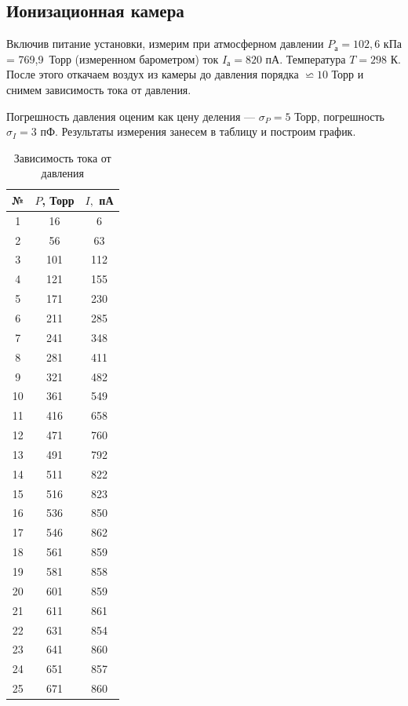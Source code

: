 \documentclass[12pt]{kiarticle}
\begin{document}
		\subsection{Ионизационная камера}
		
		Включив питание установки, измерим при атмосферном давлении $ P_а = 102,6 $ кПа = 769,9~Торр (измеренном барометром) ток $ I_а = 820 $ пА. Температура $ T = 298 $ К. После этого откачаем воздух из камеры до давления порядка $ \backsimeq 10 $ Торр и снимем зависимость тока от давления.
		
		Погрешность давления оценим как цену деления --- $ \sigma_P = 5 $ Торр, погрешность $ \sigma_I = 3 $ пФ. Результаты измерения занесем в таблицу и построим график.
		
			\begin{table}[h!]
			\caption{Зависимость тока от давления}
			\begin{center}
				\begin{tabular}{|c|c|c|}
					\hline 
					№ & $ P $, Торр & $ I, $ пА  \\ 
					\hline 
				1 & 16 & 6 \\
				2 & 56 & 63 \\
				3 & 101 & 112 \\
				4 & 121 & 155 \\
				5 & 171 & 230 \\
				6 & 211 & 285 \\
				7 & 241 & 348 \\
				8 & 281 & 411 \\
				9 & 321 & 482 \\
				10 & 361 & 549 \\
				11 & 416 & 658 \\
				12 & 471 & 760 \\
				13 & 491 & 792 \\
				14 & 511 & 822 \\
				15 & 516 & 823 \\
				16 & 536 & 850 \\
				17 & 546 & 862 \\
				18 & 561 & 859 \\
				19 & 581 & 858 \\
				20 & 601 & 859 \\
				21 & 611 & 861 \\
				22 & 631 & 854 \\
				23 & 641 & 860 \\
				24 & 651 & 857 \\
				25 & 671 & 860 \\
					\hline 
				\end{tabular} 
			\end{center}
			\label{table ion}
		\end{table}
	
\end{document}
